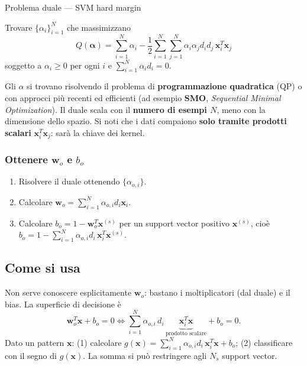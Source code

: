 \begin{boxdefinition}{Problema duale --- SVM hard margin}

Trovare \(\{\alpha_i\}_{i=1}^N\) che massimizzano \[
Q(\boldsymbol{\alpha}) = \sum_{i=1}^{N}\alpha_i - \frac{1}{2}\sum_{i=1}^{N}\sum_{j=1}^{N}\alpha_i\alpha_j d_i d_j\,\mathbf{x}_i^T\mathbf{x}_j
\] soggetto a \(\alpha_i \ge 0\) per ogni \(i\) e
\(\sum_{i=1}^{N}\alpha_i d_i = 0\).

\end{boxdefinition}

Gli \(\alpha\) si trovano risolvendo il problema di
\textbf{programmazione quadratica} (QP) o con approcci più recenti ed
efficienti (ad esempio \textbf{SMO}, \emph{Sequential Minimal
Optimization}). Il duale scala con il \textbf{numero di esempi \(N\)},
meno con la dimensione dello spazio. Si noti che i dati compaiono
\textbf{solo tramite prodotti scalari} \(\mathbf{x}_i^T\mathbf{x}_j\):
sarà la chiave dei kernel.

\subsubsection{\texorpdfstring{Ottenere \(\mathbf{w}_o\) e
\(b_o\)}{Ottenere \textbackslash mathbf\{w\}\_o e b\_o}}\label{ottenere-mathbfw_o-e-b_o}

\begin{enumerate}
\def\labelenumi{\arabic{enumi}.}
\tightlist
\item
  Risolvere il duale ottenendo \(\{\alpha_{o,i}\}\).
\item
  Calcolare \(\mathbf{w}_o = \sum_{i=1}^N\alpha_{o,i}d_i\mathbf{x}_i\).
\item
  Calcolare \(b_o = 1 - \mathbf{w}_o^T\mathbf{x}^{(s)}\) per un support
  vector positivo \(\mathbf{x}^{(s)}\), cioè
  \(b_o = 1 - \sum_{i=1}^N\alpha_{o,i}d_i\,\mathbf{x}_i^T\mathbf{x}^{(s)}\).
\end{enumerate}

\subsection{Come si usa}\label{come-si-usa}

Non serve conoscere esplicitamente \(\mathbf{w}_o\): bastano i
moltiplicatori (dal duale) e il bias. La superficie di decisione è \[
\mathbf{w}_o^T\mathbf{x} + b_o = 0 \iff \sum_{i=1}^N\alpha_{o,i}\,d_i\,\underbrace{\mathbf{x}_i^T\mathbf{x}}_{\text{prodotto scalare}} + b_o = 0.
\] Dato un pattern \(\mathbf{x}\): (1) calcolare
\(g(\mathbf{x}) = \sum_{i=1}^N\alpha_{o,i}d_i\,\mathbf{x}_i^T\mathbf{x} + b_o\);
(2) classificare con il segno di \(g(\mathbf{x})\). La somma si può
restringere agli \(N_s\) support vector.

